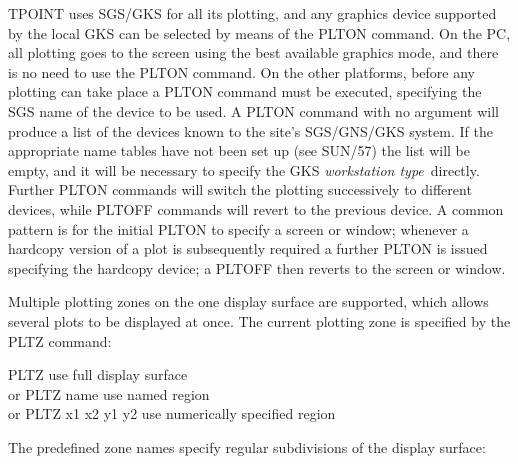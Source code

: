 TPOINT uses SGS/GKS for all its plotting, and any graphics device
supported by the local GKS can be selected by means of the PLTON command.
On the PC, all plotting goes to the screen using the best available graphics
mode, and there is no need to use the PLTON command.
On the other platforms, before any plotting can take place a PLTON command
must be executed, specifying the SGS name of the device to be used.
A PLTON command with no argument will produce a list of the devices
known to the site's SGS/GNS/GKS system.
If the appropriate name tables have not been set up (see SUN/57) the list
will be empty, and it will be necessary to specify the GKS
{\it workstation type}\, directly.
Further PLTON commands will switch the plotting successively to different
devices, while PLTOFF commands will revert to the previous device.
A common pattern is for the initial PLTON to specify a screen or window;
whenever a hardcopy version of a plot is subsequently required a further
PLTON is issued specifying the hardcopy device;
a PLTOFF then reverts to the screen or window.

Multiple plotting zones on the one display surface are
supported, which allows several plots to be displayed
at once.  The current plotting zone is specified
by the PLTZ command:
\begin{cmnds}
\> \> PLTZ \> use full display surface \\
\> or \> PLTZ name \> use named region \\
\> or \> PLTZ x1 x2 y1 y2 \> use numerically specified region
\end{cmnds}
The predefined zone names specify regular subdivisions
of the display surface:

